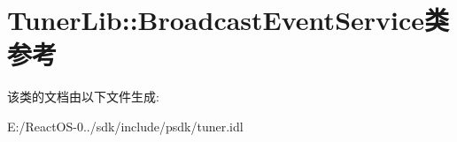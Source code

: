 \hypertarget{class_tuner_lib_1_1_broadcast_event_service}{}\section{Tuner\+Lib\+:\+:Broadcast\+Event\+Service类 参考}
\label{class_tuner_lib_1_1_broadcast_event_service}


该类的文档由以下文件生成\+:\begin{DoxyCompactItemize}
\item 
E\+:/\+React\+O\+S-\/0../sdk/include/psdk/tuner.\+idl\end{DoxyCompactItemize}

